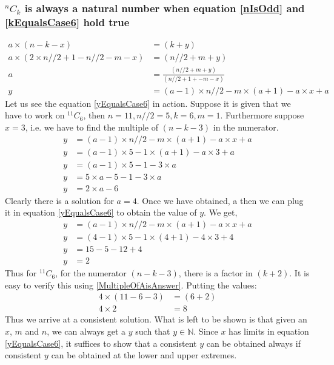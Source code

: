 \documentclass[10pt, twoside]{article}
\newcommand*{\Combination}[2]{{}^{#1}C_{#2}}%
\begin{document}
\subsubsection{$\Combination{n}{k}$ is always a natural number when equation \eqref{nIsOdd} and \eqref{kEqualsCase6} hold true}\label{ProofkEqualsCase6}
\begin{align}
	a \times (n-k-x) &= (k+y) \nonumber \\
	a \times (2\times n//2 + 1 - n//2 -m - x) &= (n//2 +m + y) \nonumber \\
	a &= \frac{(n//2 +m  + y)}{(n//2 + 1 +-m - x)} \nonumber \\
	y &= (a-1)\times n//2 -m\times(a+1) - a\times x + a \label{yEqualsCase6}	
\end{align}
Let us see the equation \eqref{yEqualsCase6} in action. \newline
Suppose it is given that we have to work on $\Combination{11}{6}$, then $n=11,n//2=5,k=6,m=1$. Furthermore suppose $x=3$, i.e. we have to find the multiple of $(n-k-3)$ in the numerator.
\begin{align*}
	y &= (a-1)\times n//2 -m\times(a+1) - a\times x + a \\
	y &= (a-1)\times 5 - 1\times(a+1) - a\times 3 + a \\
	y &= (a-1)\times 5 -1 -3\times a \\
	y &= 5\times a - 5 -1 -3\times a \\
	y &= 2\times a - 6
\end{align*}
Clearly there is a solution for $a = 4$. Once we have obtained, a then we can plug it in equation \eqref{yEqualsCase6} to obtain the value of $y$. We get,
\begin{align*}
	y &= (a-1)\times n//2 -m\times(a+1) - a\times x + a \\
	y &= (4-1)\times 5 -1\times(4+1) - 4\times 3 + 4 \\
	y &= 15 - 5 -12 + 4 \\
	y &= 2
\end{align*}
Thus for $\Combination{11}{6}$, for the numerator $(n-k-3)$, there is a factor in $(k+2)$. It is easy to verify this using \eqref{MultipleOfAisAnswer}. Putting the values:
\begin{align*}
	4\times(11-6-3) &= (6+2)\\
	4\times 2 &= 8
\end{align*}
Thus we arrive at a consistent solution.\newline
What is left to be shown is that given an $x$, $m$ and $n$, we can always get a $y$ such that $y \in \mathbb{N}$. Since $x$ has limits in equation \eqref{yEqualsCase6}, it suffices to show that a consistent $y$ can be obtained always if consistent $y$ can be obtained at the lower and upper extremes.\newline
\end{document}
